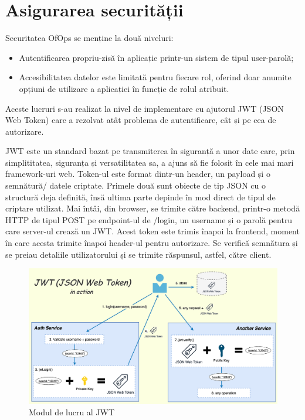 \vspace{1.5em}
\section{Asigurarea securității}

Securitatea OfOps se menține la două niveluri: \begin{itemize}[left=1.5cm]
    \item Autentificarea propriu-zisă în aplicație printr-un sistem de tipul user-parolă;
    \item Accesibilitatea datelor este limitată pentru fiecare rol, oferind doar anumite opțiuni de utilizare a aplicației în funcție de rolul atribuit.
\end{itemize}

Aceste lucruri s-au realizat la nivel de implementare cu ajutorul JWT (JSON Web Token) care a rezolvat atât problema de autentificare, cât și pe cea de autorizare. 

JWT este un standard bazat pe transmiterea în siguranță a unor date care, prin simplititatea, siguranța și versatilitatea sa, a ajuns să fie folosit în cele mai mari framework-uri web.\cite{citation6} Token-ul este format dintr-un header, un payload și o semnătură/ datele criptate. Primele două sunt obiecte de tip JSON cu o structură deja definită, însă ultima parte depinde în mod direct de tipul de criptare utilizat. Mai întâi, din browser, se trimite către backend, printr-o metodă HTTP de tipul POST pe endpoint-ul de /login, un username și o parolă pentru care server-ul crează un JWT. Acest token este trimis înapoi la frontend, moment în care acesta trimite înapoi header-ul pentru autorizare. Se verifică semnătura și se preiau detaliile utilizatorului și se trimite răspunsul, astfel, către client.
 
\begin{figure}[!htb]
    \centering
    \includegraphics[width=0.9\linewidth]{images/jwt.png}
    \caption{Modul de lucru al JWT}
    \label{fig:jwt}
\end{figure}

